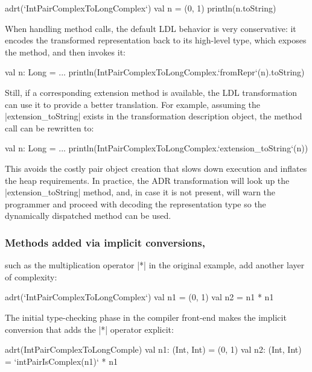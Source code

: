 \begin{lstlisting-nobreak}
adrt(`IntPairComplexToLongComplex`) {
  val n = (0, 1)
  println(n.toString)
}
\end{lstlisting-nobreak}

When handling method calls, the default LDL behavior is very conservative: it encodes the transformed representation back to its high-level type, which exposes the method, and then invokes it:

\begin{lstlisting-nobreak}
val n: Long = ...
println(IntPairComplexToLongComplex.`fromRepr`(n).toString)
\end{lstlisting-nobreak}

Still, if a corresponding extension method is available, the LDL transformation can use it to provide a better translation. For example, assuming the |extension_toString| exists in the transformation description object, the method call can be rewritten to:

\begin{lstlisting-nobreak}
val n: Long = ...
println(IntPairComplexToLongComplex.`extension_toString`(n))
\end{lstlisting-nobreak}

This avoids the costly pair object creation that slows down execution and inflates the heap requirements. In practice, the ADR transformation will look up the |extension_toString| method, and, in case it is not present, will warn the programmer and proceed with decoding the representation type so the dynamically dispatched method can be used.

\subsubsection{Methods added via implicit conversions,} such as the multiplication operator |*| in the original example, add another layer of complexity:

\begin{lstlisting-nobreak}
adrt(`IntPairComplexToLongComplex`) {
  val n1 = (0, 1)
  val n2 = n1 * n1
}
\end{lstlisting-nobreak}

The initial type-checking phase in the compiler front-end makes the implicit conversion that adds the |*| operator explicit:

\begin{lstlisting-nobreak}
adrt(IntPairComplexToLongComple) {
  val n1: (Int, Int) = (0, 1)
  val n2: (Int, Int) = `intPairIsComplex(n1)` * n1
}
\end{lstlisting-nobreak}

